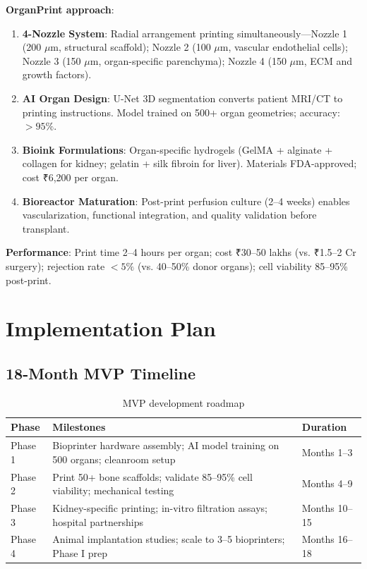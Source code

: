 \documentclass[11pt,a4paper]{article}
\begin{document}
\textbf{OrganPrint approach}:

\begin{enumerate}
\item \textbf{4-Nozzle System}: Radial arrangement printing simultaneously---Nozzle 1 (200 $\mu$m, structural scaffold); Nozzle 2 (100 $\mu$m, vascular endothelial cells); Nozzle 3 (150 $\mu$m, organ-specific parenchyma); Nozzle 4 (150 $\mu$m, ECM and growth factors).

\item \textbf{AI Organ Design}: U-Net 3D segmentation converts patient MRI/CT to printing instructions. Model trained on 500+ organ geometries; accuracy: $>95\%$.

\item \textbf{Bioink Formulations}: Organ-specific hydrogels (GelMA + alginate + collagen for kidney; gelatin + silk fibroin for liver). Materials FDA-approved; cost ₹6,200 per organ.

\item \textbf{Bioreactor Maturation}: Post-print perfusion culture (2--4 weeks) enables vascularization, functional integration, and quality validation before transplant.
\end{enumerate}

\textbf{Performance}: Print time 2--4 hours per organ; cost ₹30--50 lakhs (vs. ₹1.5--2 Cr surgery); rejection rate $<5\%$ (vs. 40--50\% donor organs); cell viability 85--95\% post-print.

\section{Implementation Plan}

\subsection{18-Month MVP Timeline}

\begin{table}[h]
\centering
\small
\begin{tabular}{lp{7cm}l}
\toprule
\textbf{Phase} & \textbf{Milestones} & \textbf{Duration} \\
\midrule
Phase 1 & Bioprinter hardware assembly; AI model training on 500 organs; cleanroom setup & Months 1--3 \\
Phase 2 & Print 50+ bone scaffolds; validate 85--95\% cell viability; mechanical testing & Months 4--9 \\
Phase 3 & Kidney-specific printing; in-vitro filtration assays; hospital partnerships & Months 10--15 \\
Phase 4 & Animal implantation studies; scale to 3--5 bioprinters; Phase I prep & Months 16--18 \\
\bottomrule
\end{tabular}
\caption{MVP development roadmap}
\end{table}
\end{document}
